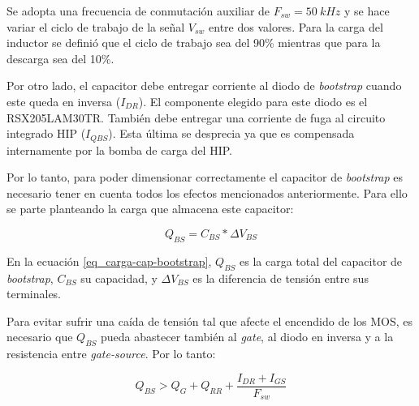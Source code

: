 \noindent Se adopta una frecuencia de conmutación auxiliar de $F_{sw}=50\:kHz$ y se hace variar el ciclo de trabajo de la señal $V_{sw}$ entre dos valores. Para la carga del inductor se definió que el ciclo de trabajo sea del 90\% mientras que para la descarga sea del 10\%.

%



\noindent Por otro lado, el capacitor debe entregar corriente al diodo de \textsl{bootstrap} cuando este queda en inversa ($I_{DR}$). El componente elegido para este diodo es el RSX205LAM30TR. También debe entregar una corriente de fuga al circuito integrado HIP ($I_{QBS}$). Esta última se desprecia ya que es compensada internamente por la bomba de carga del HIP.

\noindent Por lo tanto, para poder dimensionar correctamente el capacitor de \textsl{bootstrap} es necesario tener en cuenta todos los efectos mencionados anteriormente. Para ello se parte planteando la carga que almacena este capacitor:

\begin{equation} \label{eq_carga-cap-bootstrap}
	Q_{BS}=C_{BS}*\Delta V_{BS}
\end{equation}

\noindent En la ecuación \ref{eq_carga-cap-bootstrap}, $Q_{BS}$ es la carga total del capacitor de \textsl{bootstrap}, $C_{BS}$ su capacidad, y $\Delta V_{BS}$ es la diferencia de  tensión entre sus terminales. 

\noindent Para evitar sufrir una caída de tensión tal que afecte el encendido de los MOS, es necesario que $Q_{BS}$ pueda abastecer también al \textsl{gate}, al diodo en inversa y a la resistencia entre \textsl{gate-source}. Por lo tanto:

\begin{equation} \label{eq_carga-cap-bootstrap2}
	Q_{BS} > Q_G + Q_{RR} + \frac{I_{DR}+I_{GS}}{F_{sw}}
\end{equation}

